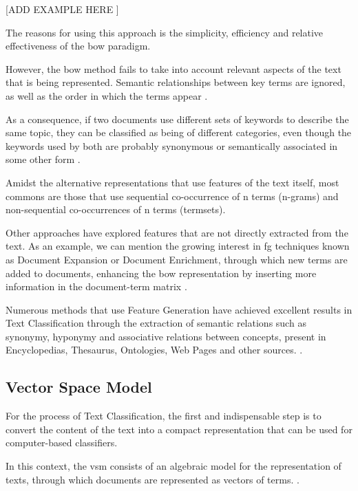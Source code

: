 [ADD EXAMPLE HERE ]

The reasons for using this approach is the simplicity, efficiency and relative effectiveness of the \gls{bow} paradigm.

However, the \gls{bow} method fails to take into account relevant aspects of the text that is being represented. Semantic relationships between key terms are ignored, as well as the order in which the terms appear \cite{Gabrilovich:2005, Lan:2009}.

As a consequence, if two documents use different sets of keywords to describe the same topic, they can be classified as being of different categories, even though the keywords used by both are probably synonymous or semantically associated in some other form \cite {Hu:2009}.

Amidst the alternative representations that use features of the text itself, most commons are those that use sequential co-occurrence of n terms (n-grams) and non-sequential co-occurrences of n terms (termsets). 

Other approaches have explored features that are not directly extracted from the text. As an example, we can mention the growing interest in \gls{fg} techniques known as Document Expansion or Document Enrichment, through which new terms are added to documents, enhancing the \gls{bow} representation by inserting more information in the document-term matrix \cite {Gabrilovich:2005}.

Numerous methods that use Feature Generation have achieved excellent results in Text Classification through the extraction of semantic relations such as synonymy, hyponymy and associative relations between concepts, present in Encyclopedias, Thesaurus, Ontologies, Web Pages and other sources. \cite{Gabrilovich:2005,Gabrilovich:2006,Hu:2008,Wang:2008, Wang:2009}.

\subsection{\hspace*{3pt}Vector Space Model}

For the process of Text Classification, the first and indispensable step is to convert the content of the text into a compact representation that can be used for computer-based classifiers.

 
In this context, the \gls{vsm} consists of an algebraic model for the representation of texts, through which documents are represented as vectors of terms. \cite{Lan:2009,Salton:1988,supreethi2010novel}.

